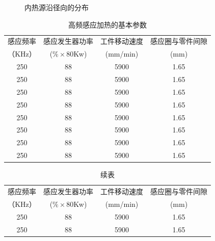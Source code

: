 \begin{figure}[htb] 
\caption{内热源沿径向的分布}
\end{figure}

\begin{table}[!htbp]
\centering
\caption{高频感应加热的基本参数}
\begin{tabular}{|c| c|c|c|}
\hline
感应频率 &感应发生器功率 & 工件移动速度  &感应圈与零件间隙\\
（KHz）&($\% \times$80Kw) &(mm/min)  &(mm)\\
\hline
250 &88 &5900 &1.65\\
\hline
250 &88 &5900 &1.65\\
\hline
250 &88 &5900 &1.65\\
\hline
250 &88 &5900 &1.65\\
\hline
250 &88 &5900 &1.65\\
\hline
250 &88 &5900 &1.65\\
\hline
250 &88 &5900 &1.65\\
\hline
250 &88 &5900 &1.65\\
\hline
\end{tabular}
\end{table}

\begin{table}
\centering
\captionsetup{singlelinecheck=off}
\caption*{续表} %
\begin{tabular}{|c| c|c|c|}
\hline
感应频率 &感应发生器功率 & 工件移动速度  &感应圈与零件间隙\\
（KHz）&($\% \times$80Kw) &(mm/min)  &(mm)\\
\hline
250 &88 &5900 &1.65\\
\hline
250 &88 &5900 &1.65\\
\hline
\end{tabular}
\end{table}


